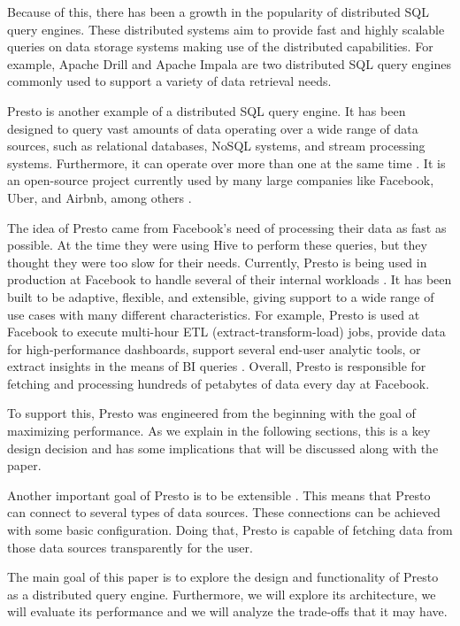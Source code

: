 \documentclass[conference]{IEEEtran}
\begin{document}
Because of this, there has been a growth in the popularity of distributed SQL query engines. These distributed systems aim to provide fast and highly scalable queries on data storage systems making use of the distributed capabilities. For example, Apache Drill and Apache Impala are two distributed SQL query engines commonly used to support a variety of data retrieval needs.

Presto is another example of a distributed SQL query engine. It has been designed to query vast amounts of data operating over a wide range of data sources, such as relational databases, NoSQL systems, and stream processing systems. Furthermore, it can operate over more than one at the same time \cite{sethi-2019}. It is an open-source project currently used by many large companies like Facebook, Uber, and Airbnb, among others \cite{facebook-presto-no-date}.

The idea of Presto came from Facebook's need of processing their data as fast as possible. At the time they were using Hive to perform these queries, but they thought they were too slow for their needs. Currently, Presto is being used in production at Facebook to handle several of their internal workloads \cite{sethi-2019}\cite{chen-2016B}. It has been built to be adaptive, flexible, and extensible, giving support to a wide range of use cases with many different characteristics. For example, Presto is used at Facebook to execute multi-hour ETL (extract-transform-load) jobs, provide data for high-performance dashboards, support several end-user analytic tools, or extract insights in the means of BI queries \cite{sethi-2019}. Overall, Presto is responsible for fetching and processing hundreds of petabytes of data every day at Facebook.

To support this, Presto was engineered from the beginning with the goal of maximizing performance. As we explain in the following sections, this is a key design decision and has some implications that will be discussed along with the paper.

Another important goal of Presto is to be extensible \cite{sethi-2019}. This means that Presto can connect to several types of data sources. These connections can be achieved with some basic configuration. Doing that, Presto is capable of fetching data from those data sources transparently for the user.

The main goal of this paper is to explore the design and functionality of Presto as a distributed query engine. Furthermore, we will explore its architecture, we will evaluate its performance and we will analyze the trade-offs that it may have.
\end{document}
